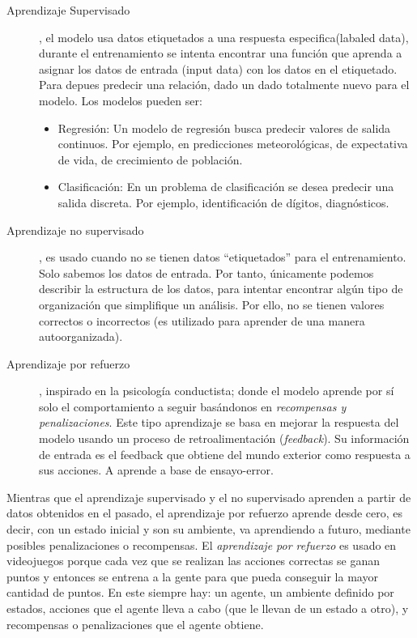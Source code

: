 \begin{description}
 \item [Aprendizaje Supervisado], el modelo usa datos etiquetados a una respuesta especifica(labaled data), durante el entrenamiento se intenta encontrar una función que aprenda a asignar los datos de entrada (input data) con los datos en el etiquetado. Para depues predecir una relación, dado un dado totalmente nuevo para el modelo. Los modelos pueden ser:
    \begin{itemize}
    \item Regresión: Un modelo de regresión busca predecir valores de salida continuos. Por ejemplo, en predicciones meteorológicas, de expectativa de vida, de crecimiento de población.
    \item Clasificación: En un problema de clasificación se desea predecir una salida discreta. Por ejemplo, identificación de dígitos, diagnósticos.
    \end{itemize}

 \item [Aprendizaje no supervisado], es usado cuando no se tienen datos “etiquetados” para el entrenamiento. Solo sabemos los datos de entrada. Por tanto, únicamente podemos describir la estructura de los datos, para intentar encontrar algún tipo de organización que simplifique un análisis. Por ello, no se tienen valores correctos o incorrectos (es utilizado para aprender de una manera autoorganizada).
 
 \item [Aprendizaje por refuerzo], inspirado en la psicología conductista; donde el modelo aprende por sí solo el comportamiento a seguir basándonos en \emph{recompensas y penalizaciones}. Este tipo aprendizaje se basa en mejorar la respuesta del modelo usando un proceso de retroalimentación (\emph{feedback}). Su información de entrada es el feedback que obtiene del mundo exterior como respuesta a sus acciones. A aprende a base de ensayo-error.
 
\end{description}


Mientras que el aprendizaje supervisado y el no supervisado aprenden a partir de datos obtenidos en el pasado, el aprendizaje por refuerzo aprende desde cero, es decir, con un estado inicial y son su ambiente, va aprendiendo a futuro, mediante posibles penalizaciones o recompensas.  El \emph{aprendizaje por refuerzo} es usado en videojuegos porque cada vez que se realizan las acciones correctas se ganan puntos y entonces se entrena a la gente para que pueda conseguir la mayor cantidad de puntos. En este siempre hay: un agente, un ambiente definido por estados, acciones que el agente lleva a cabo (que le llevan de un estado a otro), y recompensas o penalizaciones que el agente obtiene.


